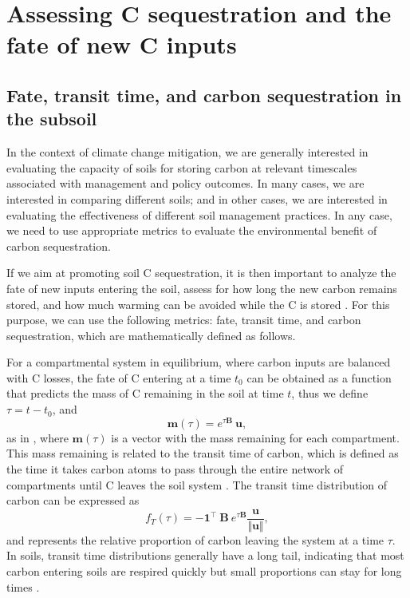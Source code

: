 \documentclass[11pt, oneside, a4paper]{article}   	%
\begin{document}
\section{Assessing C sequestration and the fate of new C inputs}
\subsection{Fate, transit time, and carbon sequestration in the subsoil}
In the context of climate change mitigation, we are generally interested in evaluating the capacity of soils for storing carbon at relevant timescales associated with management and policy outcomes. In many cases, we are interested in comparing different soils; and in other cases, we are interested in evaluating the effectiveness of different soil management practices. In any case, we need to use appropriate metrics to evaluate the environmental benefit of carbon sequestration. 

If we aim at promoting soil C sequestration, it is then important to analyze the fate of new inputs entering the soil, assess for how long the new carbon remains stored, and how much warming can be avoided while the C is stored \citep{Sierra2021BGS, Crow2022}. For this purpose, we can use the following metrics: fate, transit time, and carbon sequestration, which are mathematically defined as follows.

For a compartmental system in equilibrium, where carbon inputs are balanced with C losses, the fate of C entering at a time $t_0$ can be obtained as a function that predicts the mass of C remaining in the soil at time $t$, thus we define $\tau = t- t_0$, and  
\begin{equation} \label{eq:m}
\bm{m}(\tau) = e^{\tau \mathbf{B}} \ \bm{u},
\end{equation}
as in \citet{Sierra2021JE}, where $\bm{m}(\tau)$ is a vector with the mass remaining for each compartment. This mass remaining is related to the transit time of carbon, which is defined as the time it takes carbon atoms to pass through the entire network of compartments until C leaves the soil system \citep{Bolin1973, Manzoni2009JGR, Sierra2018JAMES}. The transit time distribution of carbon can be expressed as \citep{Metzler2018MG}
\begin{equation} \label{eq:transitTime}
f_T(\tau) = -\bm{1}^{\top} \ \mathbf{B} \ e^{\tau \mathbf{B}} \frac{\bm{u}}{\Vert \bm{u} \Vert},
\end{equation}
and represents the relative proportion of carbon leaving the system at a time $\tau$. In soils, transit time distributions generally have a long tail, indicating that most carbon entering soils are respired quickly but small proportions can stay for long times \citep{Sierra2018GBC}. 
\end{document}
